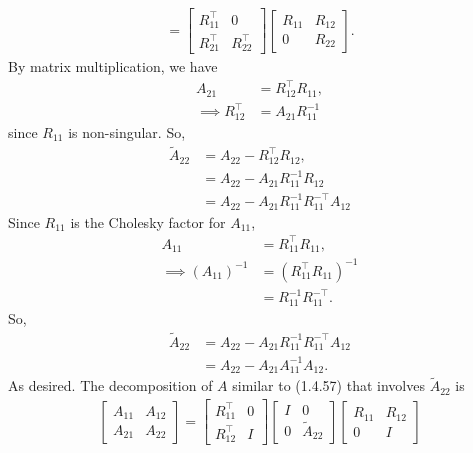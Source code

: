 \documentclass{report}
\begin{document}
\begin{remark}
\begin{align*}
        =
        \begin{bmatrix}
            R_{11}^{\top} & 0 \\
            R_{21}^{\top} & R_{22}^{\top}
        \end{bmatrix}
        \begin{bmatrix}
            R_{11} & R_{12} \\
            0 & R_{22}
        \end{bmatrix}
    .\end{align*}
    By  matrix multiplication, we have
    \begin{align*}
        A_{21} &= R_{12}^{\top}R_{11}, \\
        \implies R_{12}^{\top} &= A_{21}R_{11}^{-1}
    \end{align*}
    since $R_{11}$ is non-singular. So,
    \begin{align*}
        \tilde{A}_{22} &= A_{22} - R_{12}^{\top}R_{12}, \\
                       &= A_{22} - A_{21}R_{11}^{-1}R_{12} \\
                       &= A_{22} - A_{21}R_{11}^{-1}R_{11}^{-\top}A_{12}
    \end{align*}
    Since $R_{11}$ is the Cholesky factor for $A_{11}$, 
    \begin{align*}
        A_{11} &= R_{11}^{\top}R_{11}, \\
        \implies (A_{11})^{-1} &= (R_{11}^{\top}R_{11})^{-1} \\
                               &= R_{11}^{-1}R_{11}^{-\top}
    .\end{align*}
    So,
    \begin{align*}
        \tilde{A}_{22} &= A_{22} - A_{21}R_{11}^{-1}R_{11}^{-\top}A_{12} \\
                       &= A_{22} - A_{21}A_{11}^{-1}A_{12}
    .\end{align*}
    As desired.
    \bigbreak \noindent 
    The decomposition of $A$ similar to (1.4.57) that involves $\tilde{A}_{22}$ is
    \begin{align*}
        \begin{bmatrix}
            A_{11} & A_{12} \\
            A_{21} & A_{22}
        \end{bmatrix}
        =
        \begin{bmatrix}
            R_{11}^{\top} & 0 \\
            R_{12}^{\top} & I
        \end{bmatrix}
        \begin{bmatrix}
            I & 0 \\
            0 & \tilde{A}_{22}
        \end{bmatrix}
        \begin{bmatrix}
            R_{11} & R_{12} \\
            0 & I
        \end{bmatrix}
    \end{align*}




\end{remark}
\end{document}
